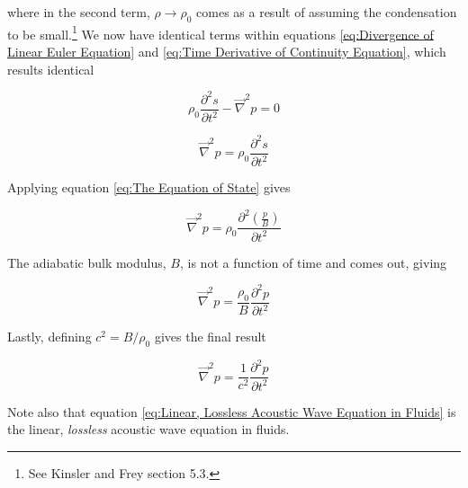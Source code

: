 where in the second term, $\rho \rightarrow \rho_0$ comes as a result of assuming the condensation to be small.\footnote{See Kinsler and Frey section 5.3.} We now have identical terms within equations \ref{eq:Divergence of Linear Euler Equation} and \ref{eq:Time Derivative of Continuity Equation}, which results identical

\begin{equation}
    \rho_0 \frac{\partial^2 s}{\partial t^2} -\vec{\nabla}^2 p = 0
\end{equation}

\begin{equation}
    \vec{\nabla}^2 p = \rho_0 \frac{\partial^2 s}{\partial t^2}
\end{equation}

Applying equation \ref{eq:The Equation of State} gives

\begin{equation}
    \vec{\nabla}^2 p = \rho_0 \frac{\partial^2 \left(\frac{p}{B}\right)}{\partial t^2}
\end{equation}

The adiabatic bulk modulus, $B$, is not a function of time and comes out, giving

\begin{equation}
    \vec{\nabla}^2 p = \frac{\rho_0}{B} \frac{\partial^2 p}{\partial t^2}
\end{equation}

Lastly, defining $c^2 = B/\rho_0$ gives the final result

\begin{equation} \label{eq:Linear, Lossless Acoustic Wave Equation in Fluids}
    \boxed{\vec{\nabla}^2 p = \frac{1}{c^2} \frac{\partial^2 p}{\partial t^2}}
\end{equation}

Note also that equation \ref{eq:Linear, Lossless Acoustic Wave Equation in Fluids} is the linear, \textit{lossless} acoustic wave equation in fluids.